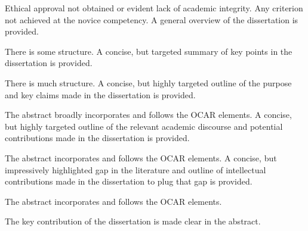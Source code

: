 \begin{markingrubric}
		\grade\fail Ethical approval not obtained or evident lack of academic integrity.
		\grade\fail Any criterion not achieved at the novice competency.
        \grade \fail 
      \grade A general overview of the dissertation is provided.
        	\par There is some structure.		
      \grade A concise, but targeted summary of key points in the dissertation is provided.
        	\par There is much structure.	      	
       \grade A concise, but highly targeted outline of the purpose and key claims made in the dissertation is provided.
        	\par The abstract broadly incorporates and follows the OCAR elements.	  
      \grade A concise, but highly targeted outline of the relevant academic discourse and potential contributions made in the dissertation is provided.
        	\par The abstract incorporates and follows the OCAR elements.	      	
       \grade A concise, but impressively highlighted gap in the literature and outline of intellectual contributions made in the dissertation to plug that gap is provided. 
        	\par The abstract incorporates and follows the OCAR elements.
        	\par The key contribution of the dissertation is made clear in the abstract.


\end{markingrubric}
